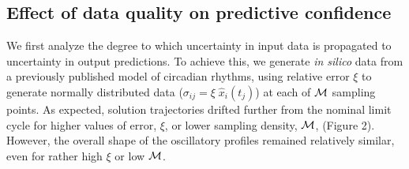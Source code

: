 \subsection{Effect of data quality on predictive confidence}

We first analyze the degree to which uncertainty in input data is propagated to
uncertainty in output predictions. To achieve this, we generate {\itshape in
silico} data from a previously published model of circadian rhythms, using
relative error $\xi$ to generate normally distributed data ($\sigma_{ij} = \xi
\; \hat{x}_{i}(t_j)$) at each of $\cal M$ sampling points. As expected, solution
trajectories drifted further from the nominal limit cycle for higher values of
error, $\xi$, or lower sampling density, $\cal M$, (Figure 2).  However, the
overall shape of the oscillatory profiles remained relatively similar, even for
rather high $\xi$ or low $\cal M$.

